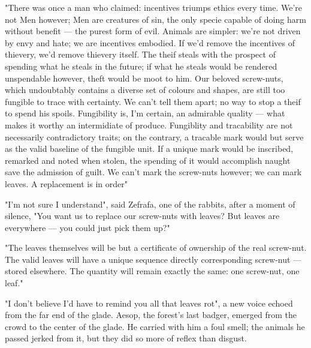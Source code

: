 
"There was once a man who claimed: incentives triumps ethics every time. We're not Men however; Men are creatures of sin, the only specie capable of doing harm without benefit — the purest form of evil. Animals are simpler: we're not driven by envy and hate; we are incentives embodied.
If we'd remove the incentives of thievery, we'd remove thievery itself. The theif steals with the prospect of spending what he steals in the future; if what he steals would be rendered unspendable however, theft would be moot to him.
Our beloved screw-nuts, which undoubtably contains a diverse set of colours and shapes, are still too fungible to trace with certainty. We can't tell them apart; no way to stop a theif to spend his spoils. Fungibility is, I'm certain, an admirable quality — what makes it worthy an intermidiate of produce. Fungiblity and tracability are not necessarily contradictory traits; on the contrary, a tracable mark would but serve as the valid baseline of the fungible unit.
If a unique mark would be inscribed, remarked and noted when stolen, the spending of it would accomplish naught save the admission of guilt.
We can't mark the screw-nuts however; we can mark leaves. A replacement is in order"

"I'm not sure I understand", said Zefrafa, one of the rabbits, after a moment of silence, "You want us to replace our screw-nuts with leaves? But leaves are everywhere — you could just pick them up?"

"The leaves themselves will be but a certificate of ownership of the real screw-nut. The valid leaves will have a unique sequence directly corresponding screw-nut — stored elsewhere. The quantity will remain exactly the same: one screw-nut, one leaf." %

"I don't believe I'd have to remind you all that leaves rot", a new voice echoed from the far end of the glade. Aesop, the forest's last badger, emerged from the crowd to the center of the glade. He carried with him a foul smell; the animals he passed jerked from it, but they did so more of reflex than disgust. 

